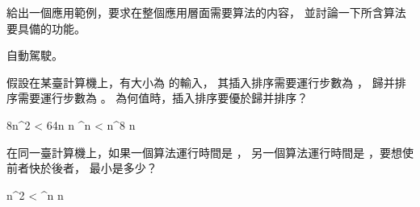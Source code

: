 \startsection[
  title={Algorithms as a technology},
]

\startEXERCISE
給出一個應用範例，要求在整個應用層面需要算法的内容，
並討論一下所含算法要具備的功能。
\stopEXERCISE

\startANSWER
自動駕駛。
\stopANSWER

\startEXERCISE
假設在某臺計算機上，有大小為  的輸入，
其插入排序需要運行步數為 ，
歸并排序需要運行步數為 。
 為何值時，插入排序要優於歸并排序？
\stopEXERCISE

\startANSWER
\startsplitformula\startmathalignment[n=3,
  align={right,middle,left}]
\NC 8n^2   \NC <   \NC 64n \lg n \NR
{}^n    \NC <   \NC n^8 \NR
{}\le n \NC \le {}  \NR
\stopmathalignment\stopsplitformula
\stopANSWER

\startEXERCISE
在同一臺計算機上，如果一個算法運行時間是 ，
另一個算法運行時間是 ，要想使前者快於後者，
 最小是多少？
\stopEXERCISE

\startANSWER
\startsplitformula\startmathalignment[n=3,
  align={right,middle,left}]
 n^2   \NC <   ^n \NR
\NC       n   \NC \ge {} \NR
\stopmathalignment\stopsplitformula
\stopANSWER

\stopsection
